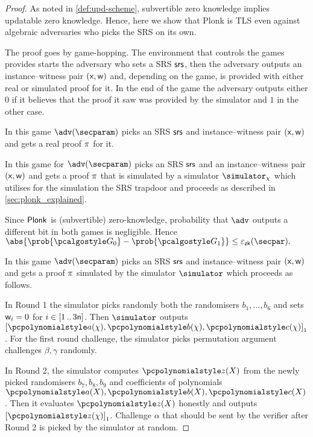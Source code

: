 \begin{proof}
  As noted in \cref{def:upd-scheme}, subvertible zero knowledge implies updatable zero
  knowledge. Hence, here we show that Plonk is TLS even against algebraic adversaries who picks
  the SRS on its own.
  
  The proof goes by game-hopping. The environment that controls the games
  provides starts the adversary who sets a SRS $\mathsf{srs}$, then the adversary outputs an
  instance--witness pair $(\mathsf{x}, \mathsf{w})$ and, depending on the game, is provided
  with either real or simulated proof for it. In the end of the game the
  adversary outputs either $0$ if it believes that the proof it saw was provided
  by the simulator and $1$ in the other case.

   In this game $\adv(\secparam)$ picks an SRS $\mathsf{srs}$ and instance--witness pair
  $(\mathsf{x}, \mathsf{w})$ and gets a real proof $\pi$ for it.

   In this game for $\adv(\secparam)$ picks an SRS $\mathsf{srs}$ and an instance--witness pair
  $(\mathsf{x}, \mathsf{w})$ and gets a proof $\pi$ that is simulated by a simulator
  $\simulator_\chi$ which utilises for the simulation the SRS trapdoor and
  proceeds as described in \cref{sec:plonk_explained}.

   Since $\textnormal{\textsf{Plonk}}$ is (subvertible) zero-knowledge,
  probability that $\adv$ outputs a different bit in both games is negligible.
  Hence
  \(
	\abs{\prob{\game{0}} - \prob{\game{1}}} \leq \epszk(\secpar).
\)

 In this game $\adv(\secparam)$ picks an SRS $\mathsf{srs}$ and instance--witness pair
$(\mathsf{x}, \mathsf{w})$ and gets a proof $\pi$ simulated by the simulator
$\simulator$ which proceeds as follows.

In Round 1 the simulator  picks randomly both the randomisers $b_1, \ldots, b_6$ and
sets $\mathsf{w}_i = 0$ for $i \in [1 \, .. \, 3\mathsf{n}]$. Then $\simulator$
outputs $\gone{\p{a}(\chi), \p{b}(\chi), \p{c}(\chi)}$. For the first round
challenge, the simulator picks permutation argument challenges $\beta, \gamma$
randomly.

In Round 2, the simulator computes $\p{z}(X)$ from
the newly picked randomisers $b_7, b_8, b_9$ and coefficients of polynomials
$\p{a}(X), \p{b}(X), \p{c}(X)$. Then it evaluates $\p{z}(X)$ honestly and outputs
$\gone{\p{z}(\chi)}$. Challenge $\alpha$ that should be sent by the verifier
after Round 2 is picked by the simulator at random.


\end{proof}
